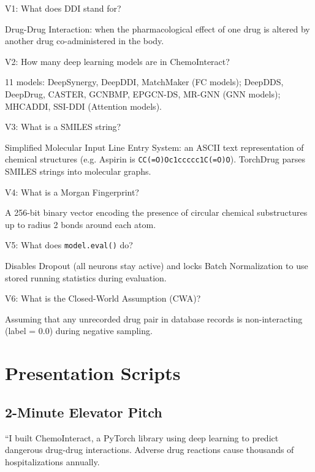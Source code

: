 \documentclass[12pt,a4paper,oneside]{article}
\begin{document}
\begin{tcolorbox}[vivabox]
V1: What does DDI stand for?
\end{tcolorbox}
Drug-Drug Interaction: when the pharmacological effect of one drug is altered by another drug co-administered in the body.

\begin{tcolorbox}[vivabox]
V2: How many deep learning models are in ChemoInteract?
\end{tcolorbox}
11 models: DeepSynergy, DeepDDI, MatchMaker (FC models); DeepDDS, DeepDrug, CASTER, GCNBMP, EPGCN-DS, MR-GNN (GNN models); MHCADDI, SSI-DDI (Attention models).

\begin{tcolorbox}[vivabox]
V3: What is a SMILES string?
\end{tcolorbox}
Simplified Molecular Input Line Entry System: an ASCII text representation of chemical structures (e.g. Aspirin is \texttt{CC(=O)Oc1ccccc1C(=O)O}). TorchDrug parses SMILES strings into molecular graphs.

\begin{tcolorbox}[vivabox]
V4: What is a Morgan Fingerprint?
\end{tcolorbox}
A 256-bit binary vector encoding the presence of circular chemical substructures up to radius 2 bonds around each atom.

\begin{tcolorbox}[vivabox]
V5: What does \texttt{model.eval()} do?
\end{tcolorbox}
Disables Dropout (all neurons stay active) and locks Batch Normalization to use stored running statistics during evaluation.

\begin{tcolorbox}[vivabox]
V6: What is the Closed-World Assumption (CWA)?
\end{tcolorbox}
Assuming that any unrecorded drug pair in database records is non-interacting (label = 0.0) during negative sampling.

\section{Presentation Scripts}\label{sec:presentation}

\subsection{2-Minute Elevator Pitch}
``I built ChemoInteract, a PyTorch library using deep learning to predict dangerous drug-drug interactions. Adverse drug reactions cause thousands of hospitalizations annually.
\end{document}
